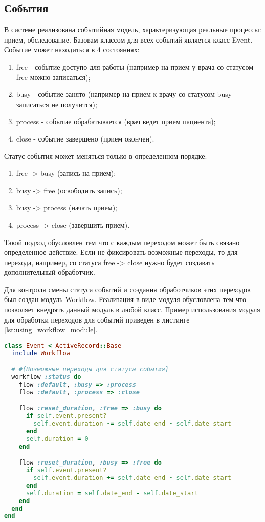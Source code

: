 \subsection{События}
В системе реализована событийная модель, характеризующая реальные процессы:
прием, обследование. Базовам классом для всех событий является класс Event.
Событие может находиться в 4 состояниях:
\begin{enumerate}
  \item free - событие доступо для работы (например на прием у врача со статусом
  free можно записаться); 
  \item busy - событие занято (например на прием к врачу со статусом busy
  записаться не получится); 
  \item process - событие обрабатывается (врач ведет прием пациента);
  \item close - событие завершено (прием окончен).   
\end{enumerate}

Статус события может меняться только в определенном порядке:
\begin{enumerate}
  \item free -> busy (запись на прием);
  \item busy -> free (освободить запись);
  \item busy -> process (начать прием);
  \item process -> close (завершить прием).
\end{enumerate}

Такой подход обусловлен тем что с каждым переходом может быть связано
определенное действие. Если не фиксировать возможные переходы, то для перехода,
например, со статуса free -> close нужно будет создавать дополнительный
обработчик.

Для контроля смены статуса событий и создания обработчиков этих переходов был
создан модуль Workflow. Реализация в виде модуля обусловлена тем что позволяет
внедрять данный модуль в любой класс. Пример использования модуля для обработки
переходов для событий приведен в листинге \ref{lst:using_workflow_module}.

\begin{lstlisting}[language=Ruby,caption=Использование модуля Workflow
,label={lst:using_workflow_module}] 
class Event < ActiveRecord::Base
  include Workflow

  # #{Возможные переходы для статуса события}
  workflow :status do
    flow :default, :busy => :process
    flow :default, :process => :close

    flow :reset_duration, :free => :busy do
      if self.event.present?
        self.event.duration -= self.date_end - self.date_start
      end
      self.duration = 0
    end

    flow :reset_duration, :busy => :free do
      if self.event.present?
        self.event.duration += self.date_end - self.date_start
      end
      self.duration = self.date_end - self.date_start
    end
  end
end
\end{lstlisting}